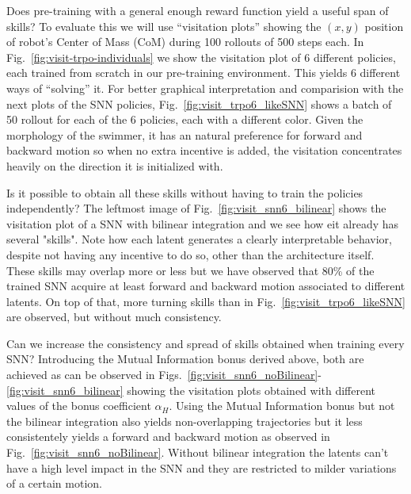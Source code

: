 \documentclass{article} %
\begin{document}
Does pre-training with a general enough reward function yield a useful span of skills? To evaluate this we will use ``visitation plots'' showing the $(x,y)$ position of robot's Center of Mass (CoM) during 100 rollouts of 500 steps each. In Fig.\ \ref{fig:visit-trpo-individuals} we show the visitation plot of 6 different policies, each trained from scratch in our pre-training environment. This yields 6 different ways of ``solving'' it. For better graphical interpretation and comparision with the next plots of the SNN policies, Fig.\ \ref{fig:visit_trpo6_likeSNN} shows a batch of 50 rollout for each of the 6 policies, each with a different color. Given the morphology of the swimmer, it has an natural preference for forward and backward motion so when no extra incentive is added, the visitation concentrates heavily on the direction it is initialized with.

Is it possible to obtain all these skills without having to train the policies independently? The leftmost image of Fig.\ \ref{fig:visit_snn6_bilinear} shows the visitation plot of a SNN with bilinear integration and we see how eit already has several "skills". Note how each latent generates a clearly interpretable behavior, despite not having any incentive to do so, other than the architecture itself. These skills may overlap more or less but we have observed that 80\% of the trained SNN acquire at least forward and backward motion associated to different latents. On top of that, more turning skills than in Fig.\ \ref{fig:visit_trpo6_likeSNN} are observed, but without much consistency.

Can we increase the consistency and spread of skills obtained when training every SNN? Introducing the Mutual Information bonus derived above, both are achieved as can be observed in Figs.\ \ref{fig:visit_snn6_noBilinear}-\ref{fig:visit_snn6_bilinear} showing the visitation plots obtained with different values of the bonus coefficient $\alpha_H$. Using the Mutual Information bonus but not the bilinear integration also yields non-overlapping trajectories but it less consistentely yields a forward and backward motion as observed in Fig.\ \ref{fig:visit_snn6_noBilinear}. Without bilinear integration the latents can't have a high level impact in the SNN and they are restricted to milder variations of a certain motion.
    
\end{document}
